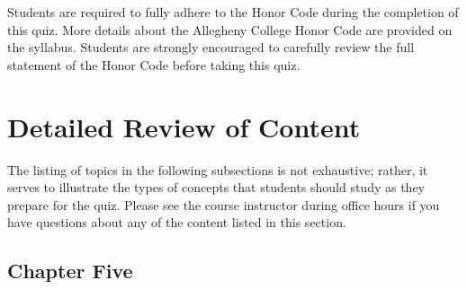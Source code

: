 \noindent Students are required to fully adhere to the Honor Code during the completion of this quiz. More details about
the Allegheny College Honor Code are provided on the syllabus. Students are strongly encouraged to carefully review the
full statement of the Honor Code before taking this quiz.




\vspace*{-.15in}
\section*{Detailed Review of Content}
\vspace*{-.1in}

The listing of topics in the following subsections is not exhaustive; rather, it serves to illustrate the types of
concepts that students should study as they prepare for the quiz. Please see the course instructor during office hours
if you have questions about any of the content listed in this section.

\vspace*{-.1in}
\subsection*{Chapter Five}
\vspace*{-.1in}

